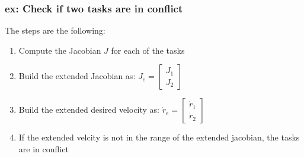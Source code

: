 \documentclass[a4paper,12pt]{article}
\begin{document}
\subsubsection{ex: Check if two tasks are in conflict}
The steps are the following:
\begin{enumerate}
    \item Compute the Jacobian $J$ for each of the tasks
    \item Build the extended Jacobian as: $J_e = \begin{bmatrix}
        J_1 \\
        J_2
    \end{bmatrix}$
    \item Build the extended desired velocity as: $\dot{r}_e = \begin{bmatrix}
        \dot{r}_1 \\
        \dot{r}_2
    \end{bmatrix}$
    \item If the extended velcity is not in the range of 
    the extended jacobian, the tasks are in conflict
\end{enumerate}
\end{document}
